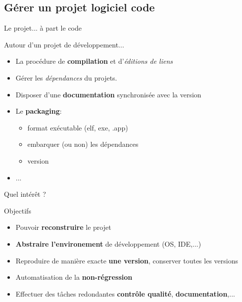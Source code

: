 \documentclass[handout]{beamer}
\begin{document}
\subsection{Gérer un projet logiciel code}
\begin{frame}{Le projet... à part le code}
	\begin{block}{Autour d'un projet de développement...}
		\begin{itemize}
 			\item La procédure de \textbf{compilation} et d'\textit{éditions de liens}
			\item Gérer les \textit{dépendances} du projets.
			\item Disposer d'une \textbf{documentation} synchronisée avec la version
			\item Le \textbf{packaging}:
			\begin{itemize}
				\item format exécutable (elf, exe, .app)
				\item embarquer (ou non) les dépendances
				\item version
			\end{itemize}	
			\item ...
		\end{itemize}
	\end{block}
\end{frame}
\begin{frame}{Quel intérêt ?}
	\begin{block}{Objectifs}
		\begin{itemize}
 			\item Pouvoir \textbf{reconstruire} le projet
			\item \textbf{Abstraire l'environement} de développement (OS, IDE,...)
			\item Reproduire de manière exacte \textbf{une version}, conserver toutes les versions
			\item Automatisation de la \textbf{non-régression}
			\item Effectuer des tâches redondantes \textbf{contrôle qualité}, \textbf{documentation},...
		\end{itemize}
	\end{block}	
\end{frame}
\end{document}
